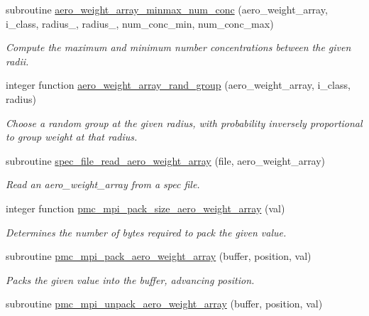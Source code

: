 \begin{DoxyCompactItemize}
subroutine \mbox{\hyperlink{namespacepmc__aero__weight__array_a3a1055fc4a1be729c0b32fc114ddffd2}{aero\+\_\+weight\+\_\+array\+\_\+minmax\+\_\+num\+\_\+conc}} (aero\+\_\+weight\+\_\+array, i\+\_\+class, radius\+\_, radius\+\_, num\+\_\+conc\+\_\+min, num\+\_\+conc\+\_\+max)
\begin{DoxyCompactList}\small\item\em Compute the maximum and minimum number concentrations between the given radii. \end{DoxyCompactList}\item 
integer function \mbox{\hyperlink{namespacepmc__aero__weight__array_a0a5faf6c66a3b2e8bddd70ac19db2927}{aero\+\_\+weight\+\_\+array\+\_\+rand\+\_\+group}} (aero\+\_\+weight\+\_\+array, i\+\_\+class, radius)
\begin{DoxyCompactList}\small\item\em Choose a random group at the given radius, with probability inversely proportional to group weight at that radius. \end{DoxyCompactList}\item 
subroutine \mbox{\hyperlink{namespacepmc__aero__weight__array_a9bc50db61d65311b62b7bae73bf7c917}{spec\+\_\+file\+\_\+read\+\_\+aero\+\_\+weight\+\_\+array}} (file, aero\+\_\+weight\+\_\+array)
\begin{DoxyCompactList}\small\item\em Read an aero\+\_\+weight\+\_\+array from a spec file. \end{DoxyCompactList}\item 
integer function \mbox{\hyperlink{namespacepmc__aero__weight__array_a1fe03c483b391b7fa2d7201b3868f9b8}{pmc\+\_\+mpi\+\_\+pack\+\_\+size\+\_\+aero\+\_\+weight\+\_\+array}} (val)
\begin{DoxyCompactList}\small\item\em Determines the number of bytes required to pack the given value. \end{DoxyCompactList}\item 
subroutine \mbox{\hyperlink{namespacepmc__aero__weight__array_a0e7bdd9d7cf073e1d57c331a46a90d3a}{pmc\+\_\+mpi\+\_\+pack\+\_\+aero\+\_\+weight\+\_\+array}} (buffer, position, val)
\begin{DoxyCompactList}\small\item\em Packs the given value into the buffer, advancing position. \end{DoxyCompactList}\item 
subroutine \mbox{\hyperlink{namespacepmc__aero__weight__array_a8f07bda93e7ef86eb3f39034f8b8e5f2}{pmc\+\_\+mpi\+\_\+unpack\+\_\+aero\+\_\+weight\+\_\+array}} (buffer, position, val)

\end{DoxyCompactItemize}
